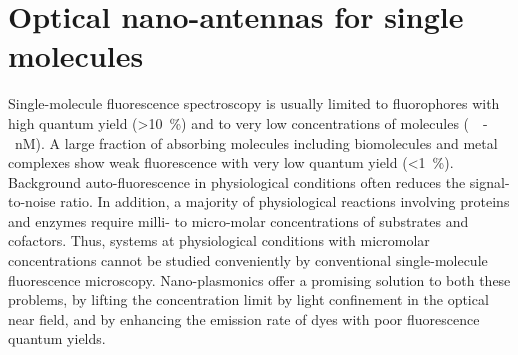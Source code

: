 \section{Optical nano-antennas for single molecules}
Single-molecule fluorescence spectroscopy is usually limited to fluorophores with high quantum yield (\SI{>10}{\percent}) and to very low concentrations of molecules (\SI{}{\pM-nM}).
A large fraction of absorbing molecules including biomolecules and metal complexes show weak fluorescence with very low quantum yield (\SI{<1}{\percent}).
Background auto-fluorescence in physiological conditions often reduces the signal-to-noise ratio.
In addition, a majority of physiological reactions involving proteins and enzymes require milli- to micro-molar concentrations of substrates and cofactors.\cite{craighead2006future,punj2013gold,fabrizio2016roadmap,punj2014thesis}
Thus, systems at physiological conditions with micromolar concentrations cannot be studied conveniently by conventional single-molecule fluorescence microscopy.
Nano-plasmonics offer a promising solution to both these problems, by lifting the concentration limit by light confinement in the optical near field, and by enhancing the emission rate of dyes with poor fluorescence quantum yields.

